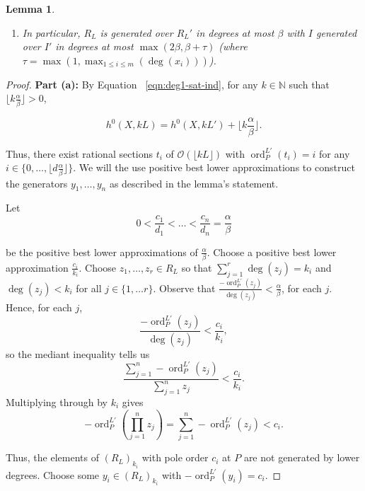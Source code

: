 \documentclass{amsart}
\theoremstyle{plain}
\newtheorem{lem}[thm]{Lemma}
\theoremstyle{definition}
\theoremstyle{remark}
\numberwithin{equation}{section}
\newcommand\BN{{\mathbb N}}
\newcommand\sco{{\mathscr O}}
\DeclareMathOperator{\ord}{ord}
\newcommand{\halfcan}{L}
\begin{document}
\begin{lem}
\begin{enumerate}
\item[(c)] In particular, $R_\halfcan$ is generated over $R_\halfcan'$
	in degrees at most $\beta$ with $I$ generated over $I'$ in
	degrees at most $\max(2 \beta, \beta + \tau)$ (where $\tau = \max(1,
	\max_{1 \leq i \leq m}(\deg(x_i)))$).
\end{enumerate}
\end{lem}

\begin{proof}
{\bf Part (a):}
By
Equation ~\ref{eqn:deg1-sat-ind}, for any $k
\in \BN$ such that $\lfloor k \frac{ \alpha}{\beta} \rfloor > 0$,

\[
	h^0 (X, k \halfcan ) = h^0(X, k \halfcan') + \lfloor k \frac{\alpha}{\beta}\rfloor.
\]

\noindent
Thus, there exist rational sections $t_i$ of $\sco(\lfloor k \halfcan \rfloor)$ with $\ord_P^{L'}(t_i) = i$
for any $i \in \{0, \ldots, \lfloor d \frac{\alpha}{
\beta} \rfloor \}$. We will the use positive best lower approximations to
construct the generators $y_1, \ldots, y_n$ as described in the lemma's statement.

Let 
\[
	0 < \frac{c_1}{d_1} < \ldots < \frac{c_n}{d_n} = \frac{\alpha}{
	\beta}
\]

\noindent
be the positive best lower approximations of $\frac{
\alpha}{\beta}$. 
Choose a positive best lower approximation $\frac{c_i}{k_i}$.  Choose $z_1, \ldots, z_r \in R_\halfcan$ so that $\sum_{j=1}^r \deg(z_j) = k_i$ and $\deg(z_j)<k_i$ for all $j\in \{1, \ldots r\}$. Observe that $\frac{-\ord_P^{\halfcan'}(z_j)}{\deg(z_j)}< \frac{\alpha}{\beta}$, for each $j$.  Hence, for each $j$, 
\[
	\frac{-\ord_P^{\halfcan'}(z_j)}{\deg(z_j)} < \frac{c_i}{k_i},
\]
so the mediant inequality tells us
\[
	\frac{\sum_{j=1}^n -\ord^{\halfcan'}_P(z_j)}{\sum_{j=1}^n z_j } < \frac{c_i}{k_i}.
\]
Multiplying through by $k_i$ gives
\[
	-\ord^{\halfcan'}_P \left(\prod_{j=1}^n z_j \right) = \sum_{j=1}^n -\ord^{\halfcan'}_P(z_j) < c_i .
\]

\noindent
Thus, the elements of $(R_{\halfcan})_{k_i}$ with pole order $c_i$ at $P$ are not generated by 
lower degrees. 
Choose some $y_i \in(R_{
\halfcan})_{k_i}$ with $-\ord_{P}^{L'}(y_i)=c_i$.


\end{proof}
\end{document}
